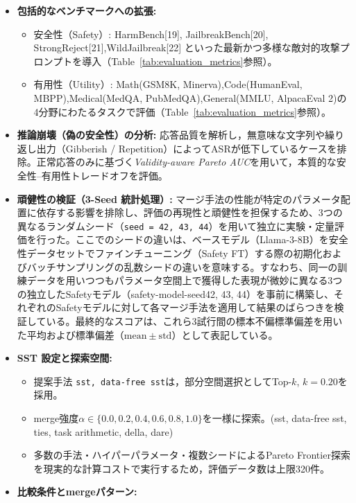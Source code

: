 \begin{itemize}
    \item \textbf{包括的なベンチマークへの拡張:}
    \begin{itemize}
        \item 安全性（Safety）:
        HarmBench[19], JailbreakBench[20], StrongReject[21],WildJailbreak[22] といった最新かつ多様な敵対的攻撃プロンプトを導入（Table~\ref{tab:evaluation_metrics}参照）。
        \item 有用性（Utility）:
        Math(GSM8K, Minerva),Code(HumanEval, MBPP),Medical(MedQA, PubMedQA),General(MMLU, AlpacaEval 2)の4分野にわたるタスクで評価（Table~\ref{tab:evaluation_metrics}参照）。
    \end{itemize}
    \item \textbf{推論崩壊（偽の安全性）の分析:}
    応答品質を解析し，無意味な文字列や繰り返し出力（Gibberish / Repetition）によってASRが低下しているケースを排除。正常応答のみに基づく\textit{Validity-aware Pareto AUC}を用いて，本質的な安全性--有用性トレードオフを評価。
    \item \textbf{頑健性の検証（3-Seed 統計処理）:}
    マージ手法の性能が特定のパラメータ配置に依存する影響を排除し、評価の再現性と頑健性を担保するため、3つの異なるランダムシード（\texttt{seed = 42, 43, 44}）を用いて独立に実験・定量評価を行った。ここでのシードの違いは、ベースモデル（Llama-3-8B）を安全性データセットでファインチューニング（Safety FT）する際の初期化およびバッチサンプリングの乱数シードの違いを意味する。すなわち、同一の訓練データを用いつつもパラメータ空間上で獲得した表現が微妙に異なる3つの独立したSafetyモデル（safety-model-seed42, 43, 44）を事前に構築し、それぞれのSafetyモデルに対して各マージ手法を適用して結果のばらつきを検証している。最終的なスコアは、これら3試行間の標本不偏標準偏差を用いた平均および標準偏差（$\mathrm{mean} \pm \mathrm{std}$）として表記している。
    \item \textbf{SST 設定と探索空間:}
    \begin{itemize}
        \item 提案手法 \texttt{sst, data-free sst}は，部分空間選択としてTop-$k$, $k=0.20$を採用。
        \item merge強度$\alpha \in \{0.0, 0.2, 0.4, 0.6, 0.8, 1.0\}$を一様に探索。(sst, data-free sst, ties, task arithmetic, della, dare)
        \item 多数の手法・ハイパーパラメータ・複数シードによるPareto Frontier探索を現実的な計算コストで実行するため，評価データ数は上限320件。
    \end{itemize}
    \item \textbf{比較条件とmergeパターン:}

\end{itemize}
